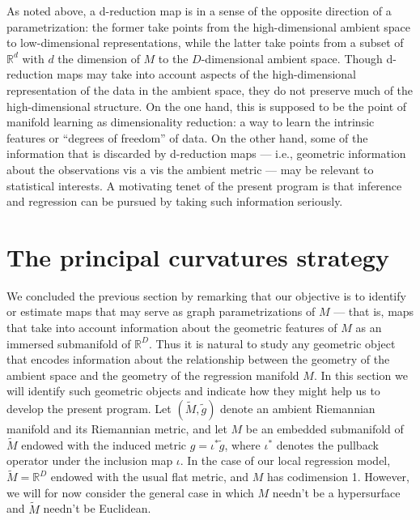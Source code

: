 \documentclass[11pt]{article}
\newcommand{\R}{\ensuremath{\mathbb{R}}}
\numberwithin{equation}{section}
\begin{document}
As noted above, a d-reduction map is in a sense of the opposite direction of a parametrization: the former take points from the high-dimensional ambient space to low-dimensional representations, while the latter take points from a subset of $\R^d$ with $d$ the dimension of $M$ to the $D$-dimensional ambient space. Though d-reduction maps may take into account aspects of the high-dimensional representation of the data in the ambient space, they do not preserve much of the high-dimensional structure. On the one hand, this is supposed to be the point of manifold learning as dimensionality reduction: a way to learn the intrinsic features or ``degrees of freedom'' of data. On the other hand, some of the information that is discarded by d-reduction maps --- i.e., geometric information about the observations vis a vis the ambient metric --- may be relevant to statistical interests. A motivating tenet of the present program is that inference and regression can be pursued by taking such information seriously.


\section{The principal curvatures strategy}

We concluded the previous section by remarking that our objective is to identify or estimate maps that may serve as graph parametrizations of $M$ --- that is, maps that take into account information about the geometric features of $M$ as an immersed submanifold of $\R^D$. Thus it is natural to study any geometric object that encodes information about the relationship between the geometry of the ambient space and the geometry of the regression manifold $M$. In this section we will identify such geometric objects and indicate how they might help us to develop the present program. Let $(\tilde{M}, \tilde{g})$ denote an ambient Riemannian manifold and its Riemannian metric, and let $M$ be an embedded submanifold of $\tilde{M}$ endowed with the induced metric $g = \iota^{*} \tilde{g}$, where $\iota^*$ denotes the pullback operator under the inclusion map $\iota$. In the case of our local regression model, $\tilde{M} = \R^D$ endowed with the usual flat metric, and $M$ has codimension 1. However, we will for now consider the general case in which $M$ needn't be a hypersurface and $\tilde{M}$ needn't be Euclidean.
\end{document}
